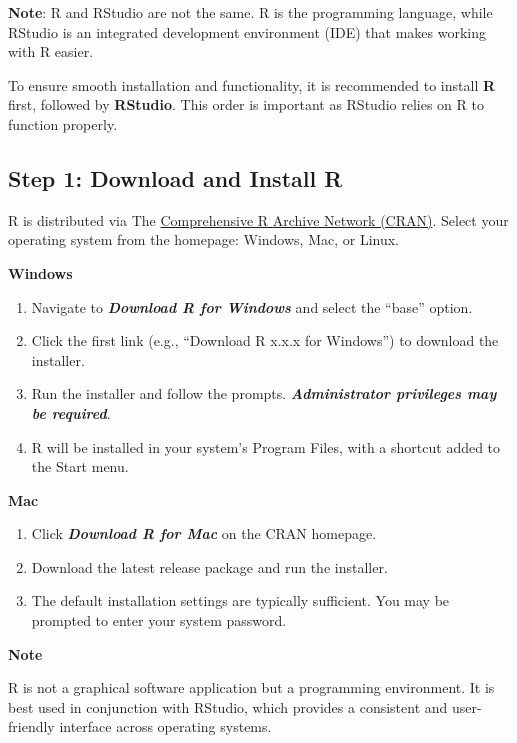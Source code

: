 \documentclass[
  english,
  letterpaper,
  DIV=11,
  numbers=noendperiod]{scrreprt}
\providecommand{\tightlist}{%
  \setlength{\itemsep}{0pt}\setlength{\parskip}{0pt}}
\begin{document}
\textbf{Note}: R and RStudio are not the same. R is the programming
language, while RStudio is an integrated development environment (IDE)
that makes working with R easier.

To ensure smooth installation and functionality, it is recommended to
install \textbf{R} first, followed by \textbf{RStudio}. This order is
important as RStudio relies on R to function properly.

\subsection{Step 1: Download and Install
R}\label{step-1-download-and-install-r}

R is distributed via The
\href{https://cran.r-project.org/}{Comprehensive R Archive Network
(CRAN)}. Select your operating system from the homepage: Windows, Mac,
or Linux.

\textbf{Windows}

\begin{enumerate}
\def\labelenumi{\arabic{enumi}.}
\tightlist
\item
  Navigate to \textbf{\emph{Download R for Windows}} and select the
  ``base'' option.
\item
  Click the first link (e.g., ``Download R x.x.x for Windows'') to
  download the installer.
\item
  Run the installer and follow the prompts. \textbf{\emph{Administrator
  privileges may be required}}.
\item
  R will be installed in your system's Program Files, with a shortcut
  added to the Start menu.
\end{enumerate}

\textbf{Mac}

\begin{enumerate}
\def\labelenumi{\arabic{enumi}.}
\tightlist
\item
  Click \textbf{\emph{Download R for Mac}} on the CRAN homepage.
\item
  Download the latest release package and run the installer.
\item
  The default installation settings are typically sufficient. You may be
  prompted to enter your system password.
\end{enumerate}

\textbf{Note}

R is not a graphical software application but a programming environment.
It is best used in conjunction with RStudio, which provides a consistent
and user-friendly interface across operating systems.
\end{document}
